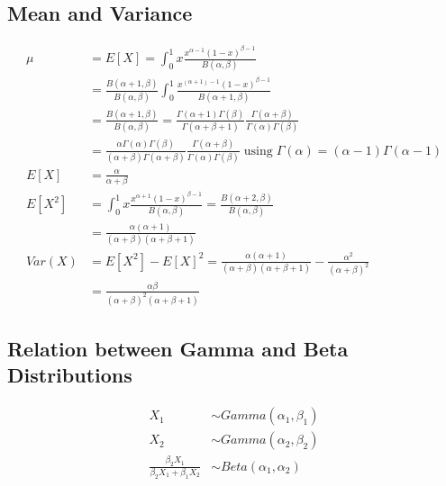 \documentclass[../../probability-notes.tex]{subfiles}
\begin{document}
    \subsection{Mean and Variance}
    \begin{align*}
        \mu &= E[X] = \int_{0}^{1} x \frac{x^{\alpha - 1}(1-x)^{\beta - 1}}{B(\alpha, \beta)}\\
        &= \frac{B(\alpha+1, \beta)}{B(\alpha, \beta)} \int_{0}^{1} \frac{x^{(\alpha + 1)-1}(1-x)^{\beta - 1}}{B(\alpha+1, \beta)}\\
        &= \frac{B(\alpha+1, \beta)}{B(\alpha, \beta)} = \frac{\Gamma(\alpha+1)\Gamma(\beta)}{\Gamma(\alpha+\beta+1)} \frac{\Gamma(\alpha+\beta)}{\Gamma(\alpha)\Gamma(\beta)}\\
        &= \frac{\alpha \Gamma(\alpha) \Gamma(\beta)}{(\alpha+\beta)\Gamma(\alpha+\beta)}  \frac{\Gamma(\alpha+\beta)}{\Gamma(\alpha)\Gamma(\beta)} \; \text{using}\; \Gamma(\alpha)=(\alpha - 1) \Gamma (\alpha - 1)\\
        E[X] &= \frac{\alpha}{\alpha + \beta}\\
        E[X^{2}] &= \int_{0}^{1} x \frac{x^{\alpha + 1}(1-x)^{\beta - 1}}{B(\alpha, \beta)} = \frac{B(\alpha + 2, \beta)}{B(\alpha, \beta)}\\
        &= \frac{\alpha(\alpha + 1)}{(\alpha + \beta)(\alpha + \beta + 1)}\\
        Var(X) &= E[X^{2}] - E[X]^{2} = \frac{\alpha(\alpha + 1)}{(\alpha + \beta)(\alpha + \beta + 1)} - \frac{\alpha^{2}}{(\alpha + \beta)^{2}}\\
        &= \frac{\alpha \beta}{(\alpha + \beta)^{2}(\alpha + \beta + 1)}
    \end{align*}

    \subsection{Relation between Gamma and Beta Distributions}
    \begin{align*}
        X_{1} &\sim Gamma(\alpha_{1}, \beta_{1})\\
        X_{2} &\sim Gamma(\alpha_{2}, \beta_{2})\\
        \frac{\beta_{2} X_{1}}{\beta_{2}X_{1} + \beta_{1}X_{2}} &\sim Beta(\alpha_{1}, \alpha_{2})\\
    \end{align*}
\end{document}
